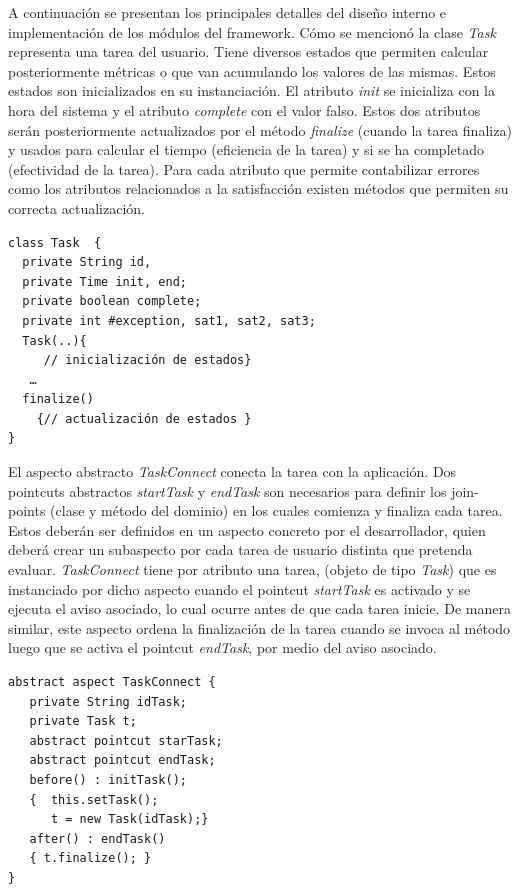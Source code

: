 A continuación se presentan los principales detalles del diseño interno e implementación de los módulos del framework. Cómo se mencionó la clase \textit{Task} representa una tarea del usuario. Tiene diversos estados que permiten calcular posteriormente métricas o que van acumulando los valores de las mismas. Estos estados son inicializados en su instanciación. El atributo \textit{init} se inicializa con la hora del sistema y el atributo \textit{complete} con el valor falso. Estos dos atributos serán posteriormente actualizados por el método \textit{finalize} (cuando la tarea finaliza) y usados para calcular el tiempo (eficiencia de la tarea) y si se ha completado (efectividad de la tarea). Para cada atributo que permite contabilizar errores como los atributos relacionados a la satisfacción existen métodos que permiten su correcta actualización. 
\squeezeup
\begin{verbatim}
class Task  {
  private String id,
  private Time init, end;
  private boolean complete;
  private int #exception, sat1, sat2, sat3;
  Task(..){
     // inicialización de estados}
   …
  finalize()
    {// actualización de estados }
}
\end{verbatim}
\squeezeup

El aspecto abstracto \textit{TaskConnect} conecta la tarea con la aplicación. Dos pointcuts abstractos \textit{startTask} y \textit{endTask} son necesarios para definir los join-points (clase y método del dominio)  en los cuales comienza y finaliza cada tarea. Estos deberán ser definidos en un aspecto concreto por el desarrollador, quien deberá crear un subaspecto por cada tarea de usuario distinta que pretenda evaluar. \textit{TaskConnect}  tiene por atributo una tarea, (objeto  de tipo \textit{Task}) que es instanciado por dicho aspecto cuando el pointcut \textit{startTask} es activado y se ejecuta el aviso asociado, lo cual ocurre antes de que cada tarea inicie. De manera similar, este aspecto ordena la finalización de la tarea cuando se invoca al método luego que se activa el pointcut \textit{endTask}, por medio del aviso asociado.  
\squeezeup
\begin{verbatim}
abstract aspect TaskConnect {
   private String idTask;
   private Task t;
   abstract pointcut starTask; 
   abstract pointcut endTask;
   before() : initTask();
   {  this.setTask();
      t = new Task(idTask);}
   after() : endTask()
   { t.finalize(); }
}
\end{verbatim}
\squeezeup

